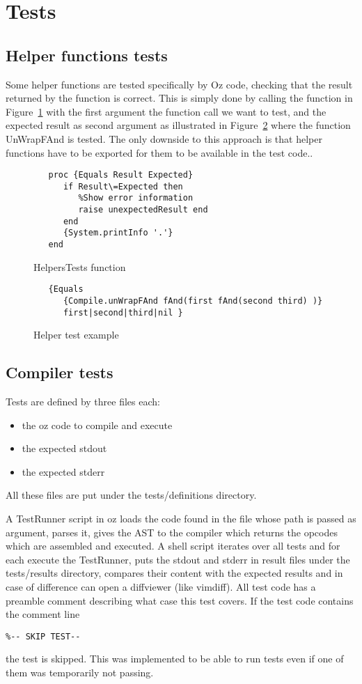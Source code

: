 \documentclass[a4paper]{memoir}
\begin{document}
\section{Tests}
\subsection{Helper functions tests}
Some helper functions are tested specifically by Oz code, checking that the result returned by the function is correct. This is simply done by calling the function in Figure~\ref{fig:helperstestsfunction} with the first argument the function call we want to test, and the expected result as second argument as illustrated in Figure~\ref{fig:helperstestsexample} where the function UnWrapFAnd is tested.
The only downside to this approach is that helper functions have to be exported for them to be available in the test code..

\begin{figure}
\begin{lstlisting}
   proc {Equals Result Expected}
      if Result\=Expected then
         %Show error information
         raise unexpectedResult end
      end
      {System.printInfo '.'}
   end
\end{lstlisting}
\label{fig:helperstestsfunction}
\caption{HelpersTests function}
\end{figure}

\begin{figure}
\begin{lstlisting}
   {Equals 
      {Compile.unWrapFAnd fAnd(first fAnd(second third) )}
      first|second|third|nil }
\end{lstlisting}
\label{fig:helperstestsexample}
\caption{Helper test example}
\end{figure}
\subsection{Compiler tests}
Tests are defined by three files each:
\begin{itemize}
  \item the oz code to compile and execute
  \item the expected stdout
  \item the expected stderr
\end{itemize}
All these files are put under the tests/definitions directory.

A TestRunner script in oz loads the code found in the file whose path is passed as argument, parses it, gives the AST to the compiler which returns the opcodes which are assembled and executed. 
A shell script iterates over all tests and for each execute the TestRunner, puts the stdout and stderr in result files under the tests/results directory, compares their content with the expected results and in case of difference can open a diffviewer (like vimdiff).
All test code has a preamble comment describing what case this test covers.
If the test code contains the comment line
\begin{lstlisting}
%-- SKIP TEST-- 
\end{lstlisting}
the test is skipped. This was implemented to be able to run tests even if one of them was temporarily not passing.
\end{document}
